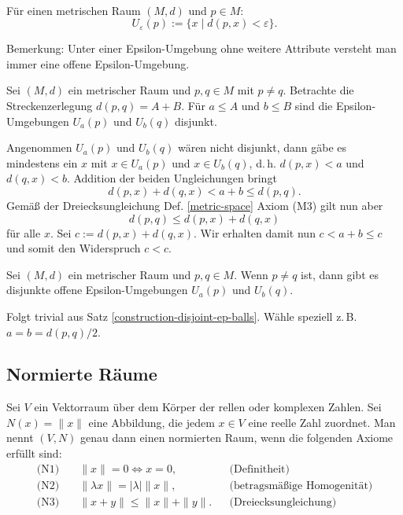 \begin{Definition}\mbox{}\\
Für einen metrischen Raum $(M,d)$ und $p\in M$:
\[U_\varepsilon(p) := \{x\mid d(p,x)<\varepsilon\}.\]
\end{Definition}
Bemerkung: Unter einer Epsilon-Umgebung ohne weitere Attribute
versteht man immer eine offene Epsilon-Umgebung.

\begin{Satz}%
\label{construction-disjoint-ep-balls}
Sei $(M,d)$ ein metrischer Raum und $p,q\in M$ mit $p\ne q$.
Betrachte die Streckenzerlegung $d(p,q)=A+B$. Für $a\le A$ und
$b\le B$ sind die Epsilon-Umgebungen $U_a(p)$ und $U_b(q)$ disjunkt.
\end{Satz}

\begin{Beweis}
Angenommen $U_a(p)$ und $U_b(q)$ wären nicht disjunkt, dann gäbe
es mindestens ein $x$ mit $x\in U_a(p)$ und $x\in U_b(q)$, d.\,h.
$d(p,x)<a$ und $d(q,x)<b$. Addition der beiden Ungleichungen
bringt
\[d(p,x)+d(q,x)<a+b\le d(p,q).\]
Gemäß der Dreiecksungleichung Def. \ref{metric-space} Axiom (M3) gilt
nun aber
\[d(p,q)\le d(p,x)+d(q,x)\]
für alle $x$. Sei $c:=d(p,x)+d(q,x)$. Wir erhalten damit nun
$c<a+b\le c$ und somit den Widerspruch $c<c$.\,\qedsymbol
\end{Beweis}

\begin{Korollar}
Sei $(M,d)$ ein metrischer Raum und $p,q\in M$.
Wenn $p\ne q$ ist, dann gibt es disjunkte offene
Epsilon-Umgebungen $U_a(p)$ und $U_b(q)$.
\end{Korollar}

\begin{Beweis}
Folgt trivial aus Satz \ref{construction-disjoint-ep-balls}.
Wähle speziell z.\,B. $a=b=d(p,q)/2$.\,\qedsymbol
\end{Beweis}

\subsection{Normierte Räume}
\begin{Definition}%
\label{def:normed-space}
Sei $V$ ein Vektorraum über dem Körper der rellen oder komplexen
Zahlen. Sei $N(x)=\|x\|$ eine Abbildung, die jedem $x\in V$ eine
reelle Zahl zuordnet. Man nennt $(V,N)$ genau dann einen
normierten Raum, wenn die folgenden Axiome erfüllt sind:
\begin{align*}
\text{(N1)}\quad &\|x\|=0\iff x=0,&&\text{(Definitheit)}\\
\text{(N2)}\quad &\|\lambda x\|=|\lambda|\|x\|,&&\text{(betragsmäßige Homogenität)}\\
\text{(N3)}\quad &\|x+y\| \le \|x\|+\|y\|.&&\text{(Dreiecksungleichung)}
\end{align*}
\end{Definition}

